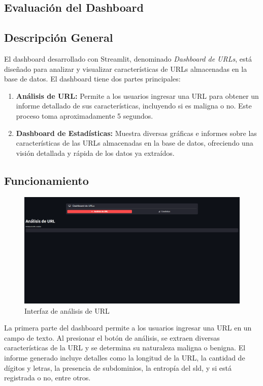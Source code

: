 \subsection{Evaluación del Dashboard}

\subsection*{Descripción General}

El dashboard desarrollado con Streamlit, denominado \textit{Dashboard de URLs}, está diseñado para analizar y visualizar características de URLs almacenadas en la base de datos. El dashboard tiene dos partes principales:

\begin{enumerate}
    \item \textbf{Análisis de URL:} Permite a los usuarios ingresar una URL para obtener un informe detallado de sus características, incluyendo si es maligna o no. Este proceso toma aproximadamente 5 segundos.
    \item \textbf{Dashboard de Estadísticas:} Muestra diversas gráficas e informes sobre las características de las URLs almacenadas en la base de datos, ofreciendo una visión detallada y rápida de los datos ya extraídos.
\end{enumerate}

\subsection*{Funcionamiento}


\begin{figure}[H]
    \centering
    \includegraphics[width=\textwidth]{interfazAnalisis.png}
    \caption{Interfaz de análisis de URL}
\end{figure}

La primera parte del dashboard permite a los usuarios ingresar una URL en un campo de texto. Al presionar el botón de análisis, se extraen diversas características de la URL y se determina su naturaleza maligna o benigna. El informe generado incluye detalles como la longitud de la URL, la cantidad de dígitos y letras, la presencia de subdominios, la entropía del \gls{sld}, y si está registrada o no, entre otros.





